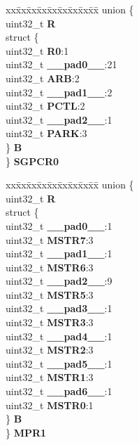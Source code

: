 \begin{DoxyCompactItemize}
\begin{tabbing}
\end{tabbing}\item 
\mbox{\label{structXBAR__tag_ab7cb375acb6c1cb4389bc45eccd2e231}} 
\begin{tabbing}
xx\=xx\=xx\=xx\=xx\=xx\=xx\=xx\=xx\=\kill
union \{\\
\>uint32\_t {\bfseries R}\\
\>struct \{\\
\>\>uint32\_t {\bfseries R0}:1\\
\>\>uint32\_t {\bfseries \_\_pad0\_\_}:21\\
\>\>uint32\_t {\bfseries ARB}:2\\
\>\>uint32\_t {\bfseries \_\_pad1\_\_}:2\\
\>\>uint32\_t {\bfseries PCTL}:2\\
\>\>uint32\_t {\bfseries \_\_pad2\_\_}:1\\
\>\>uint32\_t {\bfseries PARK}:3\\
\>\} {\bfseries B}\\
\} {\bfseries SGPCR0}\\

\end{tabbing}\item 
\mbox{\label{structXBAR__tag_a31f15bdac187c19d2b41b3cd353bfc6a}} 
\begin{tabbing}
xx\=xx\=xx\=xx\=xx\=xx\=xx\=xx\=xx\=\kill
union \{\\
\>uint32\_t {\bfseries R}\\
\>struct \{\\
\>\>uint32\_t {\bfseries \_\_pad0\_\_}:1\\
\>\>uint32\_t {\bfseries MSTR7}:3\\
\>\>uint32\_t {\bfseries \_\_pad1\_\_}:1\\
\>\>uint32\_t {\bfseries MSTR6}:3\\
\>\>uint32\_t {\bfseries \_\_pad2\_\_}:9\\
\>\>uint32\_t {\bfseries MSTR5}:3\\
\>\>uint32\_t {\bfseries \_\_pad3\_\_}:1\\
\>\>uint32\_t {\bfseries MSTR3}:3\\
\>\>uint32\_t {\bfseries \_\_pad4\_\_}:1\\
\>\>uint32\_t {\bfseries MSTR2}:3\\
\>\>uint32\_t {\bfseries \_\_pad5\_\_}:1\\
\>\>uint32\_t {\bfseries MSTR1}:3\\
\>\>uint32\_t {\bfseries \_\_pad6\_\_}:1\\
\>\>uint32\_t {\bfseries MSTR0}:1\\
\>\} {\bfseries B}\\
\} {\bfseries MPR1}\\


\end{tabbing}
\end{DoxyCompactItemize}
